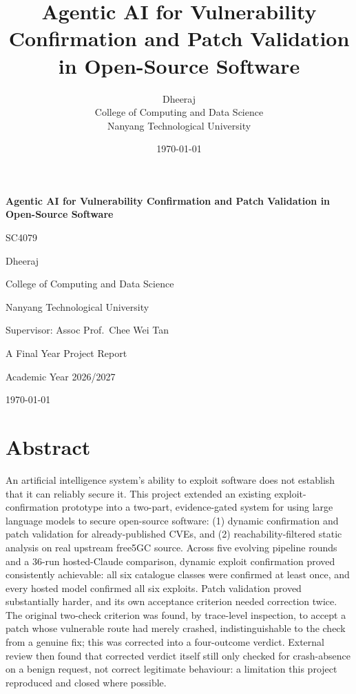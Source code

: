 \documentclass[12pt,a4paper]{report}
\title{Agentic AI for Vulnerability Confirmation and Patch Validation in Open-Source Software}
\author{Dheeraj \\ College of Computing and Data Science \\ Nanyang Technological University}
\date{\today}
\begin{document}
\begin{titlepage}
\centering
\vspace*{2cm}
{\LARGE \textbf{Agentic AI for Vulnerability Confirmation and Patch Validation in Open-Source Software} \par}
\vspace{1.5cm}
{\large SC4079 \par}
\vspace{1.5cm}
{\Large Dheeraj \par}
\vspace{1cm}
{\large College of Computing and Data Science \par}
{\large Nanyang Technological University \par}
\vspace{1.5cm}
{\large Supervisor: Assoc Prof.\ Chee Wei Tan \par}
\vspace{1.5cm}
{\large A Final Year Project Report \par}
{\large Academic Year 2026/2027 \par}
\vfill
{\large \today \par}
\end{titlepage}


\chapter*{Abstract}

An artificial intelligence system's ability to exploit software does not establish that it can reliably secure it. This project extended an existing exploit-confirmation prototype into a two-part, evidence-gated system for using large language models to secure open-source software: (1) dynamic confirmation and patch validation for already-published CVEs, and (2) reachability-filtered static analysis on real upstream free5GC source. Across five evolving pipeline rounds and a 36-run hosted-Claude comparison, dynamic exploit confirmation proved consistently achievable: all six catalogue classes were confirmed at least once, and every hosted model confirmed all six exploits. Patch validation proved substantially harder, and its own acceptance criterion needed correction twice. The original two-check criterion was found, by trace-level inspection, to accept a patch whose vulnerable route had merely crashed, indistinguishable to the check from a genuine fix; this was corrected into a four-outcome verdict. External review then found that corrected verdict itself still only checked for crash-absence on a benign request, not correct legitimate behaviour: a limitation this project reproduced and closed where possible.
\end{document}
